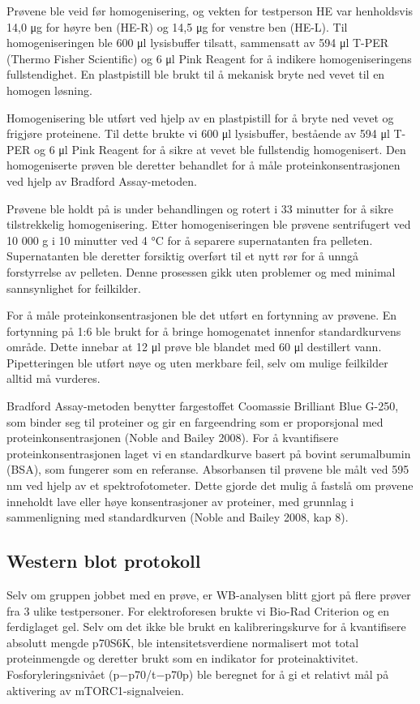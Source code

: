 \documentclass[
  letterpaper,
  DIV=11,
  numbers=noendperiod]{scrreprt}
\begin{document}
Prøvene ble veid før homogenisering, og vekten for testperson HE var
henholdsvis 14,0 μg for høyre ben (HE-R) og 14,5 μg for venstre ben
(HE-L). Til homogeniseringen ble 600 μl lysisbuffer tilsatt, sammensatt
av 594 μl T-PER (Thermo Fisher Scientific) og 6 μl Pink Reagent for å
indikere homogeniseringens fullstendighet. En plastpistill ble brukt til
å mekanisk bryte ned vevet til en homogen løsning.

Homogenisering ble utført ved hjelp av en plastpistill for å bryte ned
vevet og frigjøre proteinene. Til dette brukte vi 600 μl lysisbuffer,
bestående av 594 μl T-PER og 6 μl Pink Reagent for å sikre at vevet ble
fullstendig homogenisert. Den homogeniserte prøven ble deretter
behandlet for å måle proteinkonsentrasjonen ved hjelp av Bradford
Assay-metoden.

Prøvene ble holdt på is under behandlingen og rotert i 33 minutter for å
sikre tilstrekkelig homogenisering. Etter homogeniseringen ble prøvene
sentrifugert ved 10 000 g i 10 minutter ved 4 °C for å separere
supernatanten fra pelleten. Supernatanten ble deretter forsiktig
overført til et nytt rør for å unngå forstyrrelse av pelleten. Denne
prosessen gikk uten problemer og med minimal sannsynlighet for
feilkilder.

For å måle proteinkonsentrasjonen ble det utført en fortynning av
prøvene. En fortynning på 1:6 ble brukt for å bringe homogenatet
innenfor standardkurvens område. Dette innebar at 12 μl prøve ble
blandet med 60 μl destillert vann. Pipetteringen ble utført nøye og uten
merkbare feil, selv om mulige feilkilder alltid må vurderes.

Bradford Assay-metoden benytter fargestoffet Coomassie Brilliant Blue
G-250, som binder seg til proteiner og gir en fargeendring som er
proporsjonal med proteinkonsentrasjonen (Noble and Bailey 2008). For å
kvantifisere proteinkonsentrasjonen laget vi en standardkurve basert på
bovint serumalbumin (BSA), som fungerer som en referanse. Absorbansen
til prøvene ble målt ved 595 nm ved hjelp av et spektrofotometer. Dette
gjorde det mulig å fastslå om prøvene inneholdt lave eller høye
konsentrasjoner av proteiner, med grunnlag i sammenligning med
standardkurven (Noble and Bailey 2008, kap 8).

\subsection{Western blot protokoll}\label{western-blot-protokoll}

Selv om gruppen jobbet med en prøve, er WB-analysen blitt gjort på flere
prøver fra 3 ulike testpersoner. For elektroforesen brukte vi Bio-Rad
Criterion og en ferdiglaget gel. Selv om det ikke ble brukt en
kalibreringskurve for å kvantifisere absolutt mengde p70S6K, ble
intensitetsverdiene normalisert mot total proteinmengde og deretter
brukt som en indikator for proteinaktivitet. Fosforyleringsnivået
(p−p70/t−p70p) ble beregnet for å gi et relativt mål på aktivering av
mTORC1-signalveien.
\end{document}
